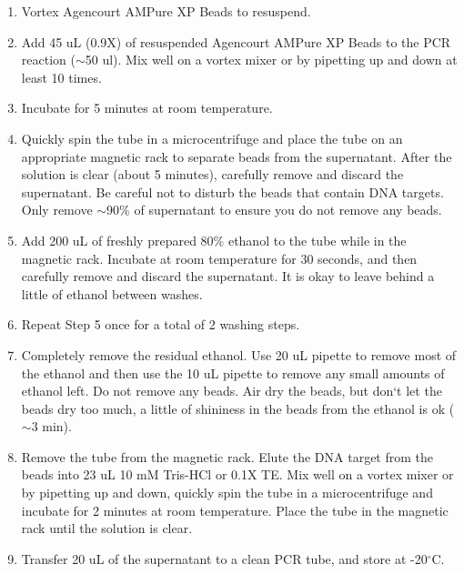 \documentclass[11pt, oneside]{article}
\begin{document}
		\begin{enumerate}
			\item Vortex Agencourt AMPure XP Beads to resuspend.
			\item Add 45 uL (0.9X) of resuspended Agencourt AMPure XP Beads to the PCR reaction ($\sim$50 ul). Mix well on a vortex mixer or by 				pipetting up and down at least 10 times.
			\item Incubate for 5 minutes at room temperature.
			\item Quickly spin the tube in a microcentrifuge and place the tube on an appropriate magnetic rack to separate beads from the supernatant. 			After the solution is clear (about 5 minutes), carefully remove and discard the supernatant. Be careful not to disturb the beads that contain 			DNA targets. Only remove $\sim$90\% of supernatant to ensure you do not remove any beads.
			\item Add 200 uL of freshly prepared 80\% ethanol to the tube while in the magnetic rack. Incubate at room temperature for 30 seconds, and 			then carefully remove and discard the supernatant. It is okay to leave behind a little of ethanol between washes. 
			\item Repeat Step 5 once for a total of 2 washing steps.
			\item Completely remove the residual ethanol. Use 20 uL pipette to remove most of the ethanol and then use the 10 uL pipette to remove any 			small amounts of ethanol left. Do not remove any beads. Air dry the beads, but don`t let the beads dry too much, a little of shininess in the 			beads from the ethanol is ok ($\sim$3 min).  
			\item Remove the tube from the magnetic rack. Elute the DNA target from the beads into 23 uL 10 mM Tris-HCl or 0.1X TE. Mix well on a 				vortex mixer or by pipetting up and down, quickly spin the tube in a microcentrifuge and incubate for 2 minutes at room temperature. Place 			the tube in the magnetic rack until the solution is clear.
			\item Transfer 20 uL of the supernatant to a clean PCR tube, and store at -20$^{\circ}$C. 
		\end{enumerate}
		
		\vspace{3mm}
		
		
		\vspace{2mm}
		
\end{document}
